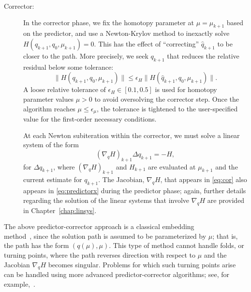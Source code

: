 \begin{description}
  \item[Corrector:] In the corrector phase, we fix the homotopy parameter
    at $\mu=\mu_{k+1}$ based on the predictor, and use a Newton-Krylov method to
    inexactly solve $H(q_{k+1},q_0,\mu_{k+1}) = 0$.  This has the effect of
    ``correcting'' $\hat{q}_{k+1}$ to be closer to the path.  More precisely,
    we seek $q_{k+1}$ that reduces the relative residual below some tolerance:
    \begin{equation}\label{eq:cornt}
      \lVert H(q_{k+1},q_0,\mu_{k+1}) \rVert \leq
      \epsilon_H \lVert H(\hat{q}_{k+1},q_0,\mu_{k+1}) \rVert.
    \end{equation}
    A loose relative tolerance of $\epsilon_H \in [0.1,0.5]$ is used for
    homotopy parameter values $\mu > 0$ to avoid oversolving the corrector step.
    Once the algorithm reaches $\mu \leq \epsilon_\mu$, the tolerance is tightened to the
    user-specified value for the first-order necessary conditions.
    
    At each Newton subiteration within the corrector, we must solve a linear
    system of the form
    \begin{equation}\label{eq:cor}
      \left(\nabla_q H \right)_{k+1} \Delta q_{k+1} = -H,
    \end{equation}
    for $\Delta q_{k+1}$, where $(\nabla_q H)_{k+1}$ and $H_{k+1}$ are evaluated
    at $\mu_{k+1}$ and the current estimate for $q_{k+1}$.  The Jacobian,
    $\nabla_q H$, that appears in \eqref{eq:cor} also appears in
    \eqref{eq:predictorx} during the predictor phase; again, further details
    regarding the solution of the linear systems that involve $\nabla_q H$ are
    provided in Chapter~\ref{chap:linsys}.

\end{description}

\begin{remark}
  The above predictor-corrector approach is a classical  embedding \\
  method~\cite{allgower_georg_1993}, since the solution path is assumed to be
  parameterized by $\mu$; that is, the path has the form $(q(\mu),\mu)$.  This
  type of method cannot handle folds, or turning points, where the path reverses
  direction with respect to $\mu$ and the Jacobian $\nabla_q H$ becomes
  singular.  Problems for which such turning points arise can be handled using
  more advanced predictor-corrector algorithms; see, for
  example,~\cite{walker:1999}.
\end{remark}

